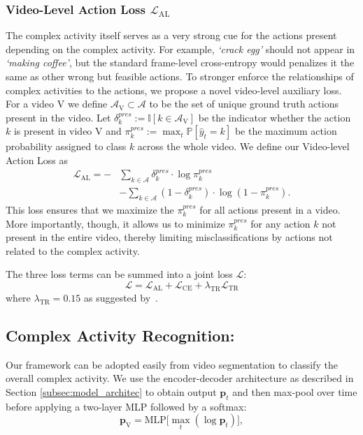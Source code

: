 \documentclass[10pt,twocolumn,letterpaper]{article}
\newcommand{\calL}{\mathcal{L}}
\newcommand{\calA}{\mathcal{A}}
\newcommand{\bbI}{\mathbb{I}}
\newcommand{\bp}{\mathbf{p}}
\newcommand{\vid}{\ensuremath{\text{V}}}
\newcommand{\PP}{\ensuremath{\mathbb{P}}}
\newcommand{\sqBK}[1]{ {\left[ #1 \right]} }
\begin{document}
\subsubsection{Video-Level Action Loss $\calL_{\text{AL}}$}\label{subsec:action_loss} 
The complex activity itself serves as a very strong cue for the actions present depending on the complex activity.  For example, \emph{`crack egg'} should not appear in \emph{`making coffee'}, but the standard frame-level cross-entropy would penalizes it the same as other wrong but feasible actions. 
To stronger enforce the relationships of complex activities to the actions, we propose a novel video-level auxiliary loss.
For a video $\vid$ we define $\calA_{\vid} \subset \calA$ to be the set of unique ground truth actions present in the video. Let $\delta^{pres}_k := \bbI\sqBK{k \in \calA_{\vid}}$ be the indicator whether the action $k$ is present in video $\vid$ and $\pi^{pres}_k := \max_{t} \PP\sqBK{\hat{y}_t = k}$ be the maximum action probability assigned to class $k$ across the whole video. We define our {Video-level Action Loss} as
\begin{equation}
    \begin{split}
        \calL_{\text{AL}} = -&\sum_{k\in \calA} \delta^{pres}_k \cdot \log\pi^{pres}_k \,\, \\
        & - \sum_{k\in \calA} (1 - \delta^{pres}_k) \cdot \log(1 - \pi^{pres}_k).
    \end{split}
\end{equation}
This loss ensures that we maximize the $\pi^{pres}_k$ for all actions present in a video.  More importantly, though, it allows us to minimize $\pi^{pres}_k$ for any action $k$ not present in the entire video, thereby limiting misclassifications by actions not related to the complex activity.

The three loss terms can be summed into a joint loss $\calL$:
\begin{equation}
    \calL = \calL_{\text{AL}} + \mathcal{L}_{\text{CE}} + \lambda_{\text{TR}} \mathcal{L}_{\text{TR}}
\end{equation}
where $\lambda_{\text{TR}}\!=\!0.15$ as suggested by~\cite{li2020ms, farha2019ms}.

\subsection{Complex Activity Recognition:} 
Our framework can be adopted easily from video segmentation to classify the overall complex activity.  We use the encoder-decoder architecture as described in Section \ref{subsec:model_architec} to obtain output $\bp_t$ and then max-pool over time before applying a two-layer MLP followed by a softmax:
\begin{equation}
             \bp_{\text{V}} = \text{MLP}\big[\max_t (\log {\bp}_t)\big],
\end{equation}
\end{document}
